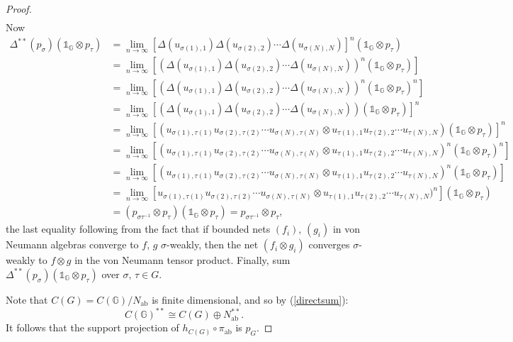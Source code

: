\documentclass[12pt]{amsart}
\theoremstyle{remark}
\theoremstyle{remark}
\begin{document}
\begin{proof}
\begin{align*}
                \end{align*}
                Now
\begin{align*}
\Delta^{**}(p_\sigma)(\mathds{1}_{\mathbb{G}}\otimes p_\tau)&=\lim_{n\to\infty}\left[\Delta(u_{\sigma(1),1}) \Delta(u_{\sigma(2),2})\cdots\Delta(u_{\sigma(N),N})\right]^n(\mathds{1}_{\mathbb{G}}\otimes p_\tau)
\\ &=\lim_{n\to\infty}\left[\left(\Delta(u_{\sigma(1),1}) \Delta(u_{\sigma(2),2})\cdots\Delta(u_{\sigma(N),N})\right)^n(\mathds{1}_{\mathbb{G}}\otimes p_\tau)\right]
\\ &=\lim_{n\to\infty}\left[\left(\Delta(u_{\sigma(1),1}) \Delta(u_{\sigma(2),2})\cdots\Delta(u_{\sigma(N),N})\right)^n(\mathds{1}_{\mathbb{G}}\otimes p_\tau)^n\right]
\\&=\lim_{n\to\infty}\left[\left(\Delta(u_{\sigma(1),1}) \Delta(u_{\sigma(2),2})\cdots\Delta(u_{\sigma(N),N})\right)(\mathds{1}_{\mathbb{G}}\otimes p_\tau)\right]^n
\\&=\lim_{n\to\infty}\left[(u_{\sigma(1),\tau(1)}u_{\sigma(2),\tau(2)}\cdots u_{\sigma(N),\tau(N)}\otimes u_{\tau(1),1}u_{\tau(2),2}\cdots u_{\tau(N),N})(\mathds{1}_{\mathbb{G}}\otimes p_{\tau})\right]^n
\\&=\lim_{n\to\infty}\left[(u_{\sigma(1),\tau(1)}u_{\sigma(2),\tau(2)}\cdots u_{\sigma(N),\tau(N)}\otimes u_{\tau(1),1}u_{\tau(2),2}\cdots u_{\tau(N),N})^n(\mathds{1}_{\mathbb{G}}\otimes p_{\tau})^n\right]
\\&=\lim_{n\to\infty}\left[(u_{\sigma(1),\tau(1)}u_{\sigma(2),\tau(2)}\cdots u_{\sigma(N),\tau(N)}\otimes u_{\tau(1),1}u_{\tau(2),2}\cdots u_{\tau(N),N})^n(\mathds{1}_{\mathbb{G}}\otimes p_{\tau})\right]
\\&=\lim_{n\to\infty}\left[u_{\sigma(1),\tau(1)}u_{\sigma(2),\tau(2)}\cdots u_{\sigma(N),\tau(N)}\otimes u_{\tau(1),1}u_{\tau(2),2}\cdots u_{\tau(N),N})^n\right](\mathds{1}_{\mathbb{G}}\otimes p_{\tau})
\\&=(p_{\sigma\tau^{-1}}\otimes p_{\tau})(\mathds{1}_{\mathbb{G}}\otimes p_{\tau})=p_{\sigma\tau^{-1}}\otimes p_{\tau},
\end{align*}
the last equality following from the fact that if bounded nets $(f_i),\,(g_i)$ in von Neumann algebras converge to $f,\,g$ $\sigma$-weakly, then the net $(f_i\otimes g_i)$ converges $\sigma$-weakly to $f\otimes g$ in the von Neumann tensor product. Finally, sum $\Delta^{**}(p_\sigma)(\mathds{1}_{\mathbb{G}}\otimes p_\tau)$ over $\sigma,\,\tau\in G$.

\bigskip

Note that $C(G)=C(\mathbb{G})/N_{\text{ab}}$ is finite dimensional, and so by (\ref{directsum}):
$$C(\mathbb{G})^{**}\cong C(G)\oplus N_{\text{ab}}^{**}.$$
It follows that the support projection of $h_{C(G)}\circ \pi_{\text{ab}}$ is $p_G$.
\end{proof}
\end{document}
